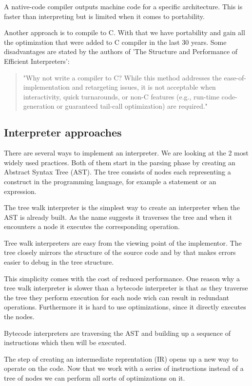 \documentclass{article}
\begin{document}
A native-code compiler outputs machine code for a specific architecture. This is faster
than interpreting but is limited when it comes to portability.

Another approach is to compile to C. With that we have portability and gain all the 
optimization that were added to C compiler in the last 30 years. Some disadvantages
are stated by the authors of 'The Structure and Performance of Efficient Interpreters':

\begin{quotation} 
"Why not write a compiler to C? While this method addresses the
ease-of-implementation and retargeting issues, it is not acceptable when
interactivity, quick turnarounds, or non-C features (e.g., run-time
code-generation or guaranteed tail-call optimization) are required."
~\cite{structure_and_performance}
\end{quotation} 

\subsection{Interpreter approaches}
There are several ways to implement an interpreter. We are looking
at the 2 most widely used practices. 
Both of them start in the parsing phase by creating an Abstract Syntax
Tree (AST). The tree consists of nodes each representing a construct in
the programming language, for example a statement or an expression.

The tree walk interpreter is the simplest way to create an interpreter when the
AST is already built. As the name suggests it traverses the tree and when it
encounters a node it executes the corresponding operation.

Tree walk interpreters are easy from the viewing point of the implementor. The
tree closely mirrors the structure of the source code and by that makes errors
easier to debug in the tree structure.

This simplicity comes with the cost of reduced performance. One reason why a
tree walk interpreter is slower than a bytecode interpreter is that as they
traverse the tree they perform execution for each node wich can result in
redundant operations. Furthermore it is hard to use optimizations, since
it directly executes the nodes.

Bytecode interpreters are traversing the AST and building up a sequence of 
instructions which then will be executed. 

The step of creating an intermediate reprentation (IR) opens up a new way to
operate on the code. Now that we work with a series of instructions instead of
a tree of nodes we can perform all sorts of optimizations on it.
\end{document}
